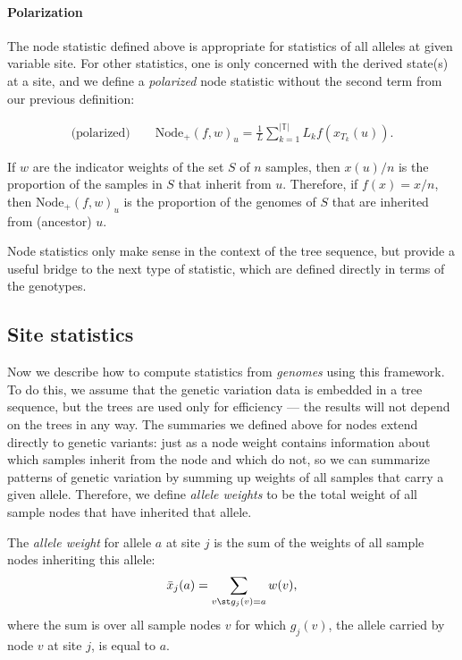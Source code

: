 \documentclass{article}
\newcommand{\nodep}{\mbox{Node}_+} %
\newcommand{\treeseq}{\mathbb{T}} %
\newcommand{\iw}{w} %
\newcommand{\nw}{x} %
\newcommand{\aw}{{\bar x}} %
\begin{document}
\paragraph{Polarization}
The node statistic defined above is appropriate for statistics of all alleles at given variable site.
For other statistics, one is only concerned with the derived state(s) at a site,
and we define a \emph{polarized} node statistic without the second term from our previous definition:

\begin{align}
    \text{(polarized)} \qquad
    \nodep(f, \iw)_u
    =
    \frac{1}{L} \sum_{k=1}^{|\treeseq|} L_k f(\nw_{T_k}(u)) .
\end{align}

\begin{example} \label{ex:ancestry_props}
    If $\iw$ are the indicator weights of the set $S$ of $n$ samples,
    then $\nw(u) / n$ is the proportion of the samples in $S$ that inherit from $u$.
    Therefore, if $f(x) = x / n$,
    then $\nodep(f, \iw)_u$ is the proportion of the genomes of $S$
    that are inherited from (ancestor) $u$.
\end{example}

Node statistics only make sense in the context of the tree sequence,
but provide a useful bridge to the next type of statistic,
which are defined directly in terms of the genotypes.


\subsection*{Site statistics}

Now we describe how to compute statistics from \emph{genomes} using this framework.
To do this, we assume that the genetic variation data is embedded in a tree sequence,
but the trees are used only for efficiency --- the results will not depend on
the trees in any way. The summaries we defined above for nodes
extend directly to genetic variants: just as a node weight contains information about
which samples inherit from the node and which do not,
so we can summarize patterns of genetic variation by summing up weights of all samples
that carry a given allele.
Therefore, we define \emph{allele weights} to be
the total weight of all sample nodes that have inherited that allele.

\begin{definition}
    The \emph{allele weight} for allele $a$ at site $j$ is the sum of the weights
    of all sample nodes inheriting this allele:
    \begin{align*}
        \aw_j(a) = \sum_{v \st g_j(v) = a} \iw(v) ,
    \end{align*}
    where the sum is over all sample nodes $v$ for which
    $g_j(v)$, the allele carried by node $v$ at site $j$, is equal to $a$.
\end{definition}
\end{document}
